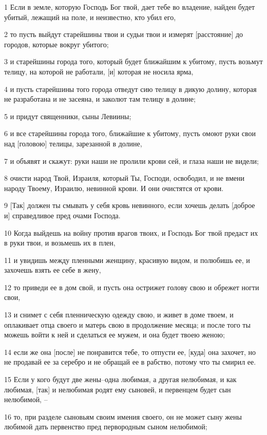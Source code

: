 \par 1 Если в земле, которую Господь Бог твой, дает тебе во владение, найден будет убитый, лежащий на поле, и неизвестно, кто убил его,
\par 2 то пусть выйдут старейшины твои и судьи твои и измерят [расстояние] до городов, которые вокруг убитого;
\par 3 и старейшины города того, который будет ближайшим к убитому, пусть возьмут телицу, на которой не работали, [и] которая не носила ярма,
\par 4 и пусть старейшины того города отведут сию телицу в дикую долину, которая не разработана и не засеяна, и заколют там телицу в долине;
\par 5 и придут священники, сыны Левиины;
\par 6 и все старейшины города того, ближайшие к убитому, пусть омоют руки свои над [головою] телицы, зарезанной в долине,
\par 7 и объявят и скажут: руки наши не пролили крови сей, и глаза наши не видели;
\par 8 очисти народ Твой, Израиля, который Ты, Господи, освободил, и не вмени народу Твоему, Израилю, невинной крови. И они очистятся от крови.
\par 9 [Так] должен ты смывать у себя кровь невинного, если хочешь делать [доброе и] справедливое пред очами Господа.
\par 10 Когда выйдешь на войну против врагов твоих, и Господь Бог твой предаст их в руки твои, и возьмешь их в плен,
\par 11 и увидишь между пленными женщину, красивую видом, и полюбишь ее, и захочешь взять ее себе в жену,
\par 12 то приведи ее в дом свой, и пусть она острижет голову свою и обрежет ногти свои,
\par 13 и снимет с себя пленническую одежду свою, и живет в доме твоем, и оплакивает отца своего и матерь свою в продолжение месяца; и после того ты можешь войти к ней и сделаться ее мужем, и она будет твоею женою;
\par 14 если же она [после] не понравится тебе, то отпусти ее, [куда] она захочет, но не продавай ее за серебро и не обращай ее в рабство, потому что ты смирил ее.
\par 15 Если у кого будут две жены--одна любимая, а другая нелюбимая, и как любимая, [так] и нелюбимая родят ему сыновей, и первенцем будет сын нелюбимой, --
\par 16 то, при разделе сыновьям своим имения своего, он не может сыну жены любимой дать первенство пред первородным сыном нелюбимой;
